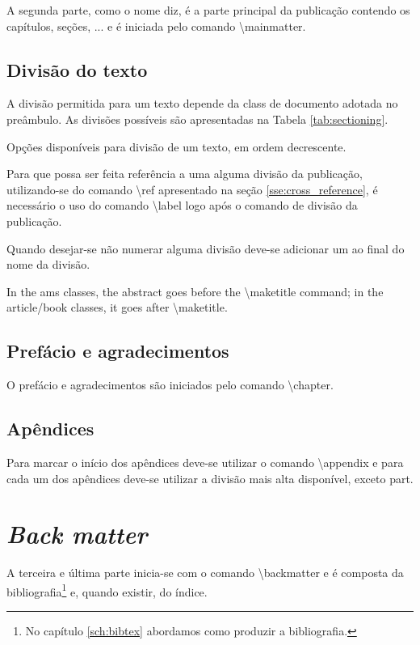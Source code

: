 A segunda parte, como o nome diz, é a parte principal da publicação contendo os capítulos, seções, ... e é iniciada pelo comando \textbackslash\textsf{mainmatter}.

\subsection{Divisão do texto} \label{sss:divisao_do_texto}

A divisão permitida para um texto depende da \textsf{class} de documento adotada no preâmbulo. As divisões possíveis são apresentadas na Tabela \ref{tab:sectioning}.
\begin{table}[h!tb]
    \centering
    \caption{Opções disponíveis para divisão de um texto, em ordem decrescente.}
    \label{tab:sectioning}
\end{table}

Para que possa ser feita referência a uma alguma divisão da publicação, utilizando-se do comando \textbackslash\textsf{ref} apresentado na seção \ref{sse:cross_reference}, é necessário o uso do comando \textbackslash\textsf{label} logo após o comando de divisão da publicação.

Quando desejar-se não numerar alguma divisão deve-se adicionar um \textasteriskcentered ao final do nome da divisão.

In the ams classes, the abstract goes before the \textbackslash\textsf{maketitle} command; in the article/book classes, it goes after \textbackslash\textsf{maketitle}.

\subsection{Prefácio e agradecimentos}

O prefácio e agradecimentos são iniciados pelo comando \textbackslash\textsf{chapter}\textasteriskcentered .

\subsection{Apêndices}

Para marcar o início dos apêndices deve-se utilizar o comando \textbackslash\textsf{appendix} e para cada um dos apêndices deve-se utilizar a divisão mais alta disponível, exceto \textsf{part}.

\section{\textit{Back matter}}

A terceira e última parte inicia-se com o comando \textbackslash\textsf{backmatter} e é composta da bibliografia\footnote{No capítulo \ref{sch:bibtex} abordamos como produzir a bibliografia.} e, quando existir, do índice.
